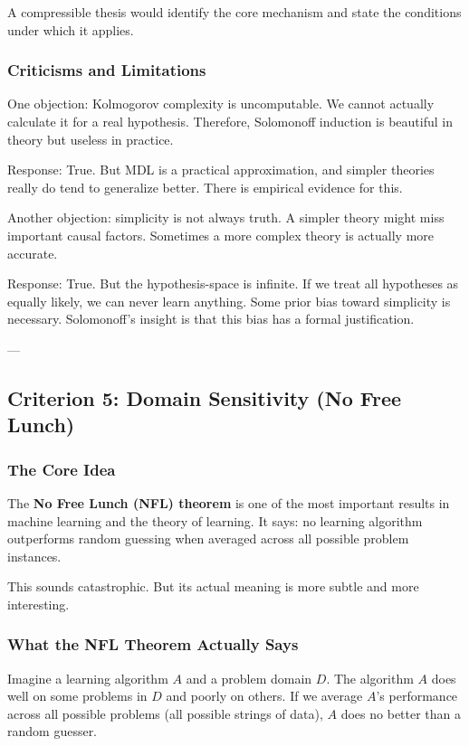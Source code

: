 \documentclass[11pt,letterpaper]{article}
\begin{document}
A compressible thesis would identify the core mechanism and state the conditions under which it applies.

\subsubsection*{Criticisms and Limitations}

One objection: Kolmogorov complexity is uncomputable. We cannot actually calculate it for a real hypothesis. Therefore, Solomonoff induction is beautiful in theory but useless in practice.

Response: True. But MDL is a practical approximation, and simpler theories really do tend to generalize better. There is empirical evidence for this.

Another objection: simplicity is not always truth. A simpler theory might miss important causal factors. Sometimes a more complex theory is actually more accurate.

Response: True. But the hypothesis-space is infinite. If we treat all hypotheses as equally likely, we can never learn anything. Some prior bias toward simplicity is necessary. Solomonoff's insight is that this bias has a formal justification.

---

\newpage

\subsection{Criterion 5: Domain Sensitivity (No Free Lunch)}

\subsubsection*{The Core Idea}

The \textbf{No Free Lunch (NFL) theorem} is one of the most important results in machine learning and the theory of learning. It says: no learning algorithm outperforms random guessing when averaged across all possible problem instances.

This sounds catastrophic. But its actual meaning is more subtle and more interesting.

\subsubsection*{What the NFL Theorem Actually Says}

Imagine a learning algorithm $A$ and a problem domain $D$. The algorithm $A$ does well on some problems in $D$ and poorly on others. If we average $A$'s performance across all possible problems (all possible strings of data), $A$ does no better than a random guesser.
\end{document}
